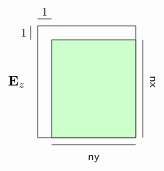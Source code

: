 \documentclass[10pt]{article}
\begin{document}
\[\begin{tikzpicture}
%
\node[draw=black,minimum width=7em,minimum height=8em,rectangle]  at (0,0) {};
\node[draw=black,fill=green!20,minimum width=6em,minimum height=7em,rectangle]  at (0.5em,-0.5em) {};
%
\node[]  at (-5em,0) {${\bf E}_z$};
%
\draw[] (-4em,4em) -- (-4em,3em);
\draw[] (-3.5em,4.5em) -- (-2.5em,4.5em);
\draw[] (-2.5em,-4.5em) -- (3.5em,-4.5em);
\draw[] (4em,-4em) -- (4em,3em);
%
\node[]  at (0.5em,-5.5em) {\footnotesize{{\sf ny}}};
\node[rotate=-90]  at (4.7em,0) {\footnotesize{{\sf nx}}};
\node[]  at (-4.5em,3.5em) {\footnotesize{1}};
\node[]  at (-3em,5em) {\footnotesize{1}};
\end{tikzpicture}
\]
\end{document}
